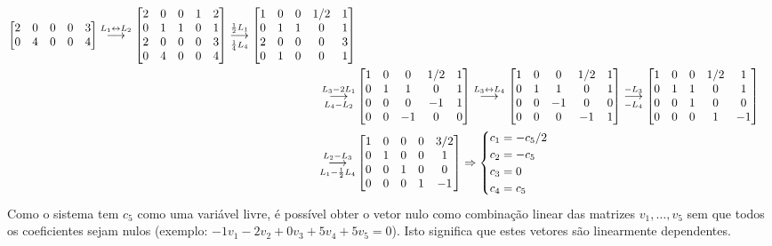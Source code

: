 \documentclass[12pt,a4paper]{article}
\newcommand{\grstep}[2][\relax]{%
   \ensuremath{\mathrel{
       {\mathop{\longrightarrow}\limits^{#2\mathstrut}_{
                                     \begin{subarray}{l} #1 \end{subarray}}}}}}
\newcommand{\swap}{\leftrightarrow}
\begin{document}
\begin{enumerate}
\begin{enumerate}
\begin{align*}
\begin{bmatrix}
2 & 0 & 0 & 0 & 3 \\
0 & 4 & 0 & 0 & 4
\end{bmatrix}
\grstep{ L_1 \swap L_2 }
\begin{bmatrix}
2 & 0 & 0 & 1 & 2 \\
0 & 1 & 1 & 0 & 1 \\
2 & 0 & 0 & 0 & 3 \\
0 & 4 & 0 & 0 & 4
\end{bmatrix}
\grstep[ \frac{1}{4}L_4 ]{ \frac{1}{2}L_1 }
\begin{bmatrix}
1 & 0 & 0 & 1/2 & 1 \\
0 & 1 & 1 & 0 & 1 \\
2 & 0 & 0 & 0 & 3 \\
0 & 1 & 0 & 0 & 1
\end{bmatrix}\\
\grstep[ L_4 - L_2 ]{ L_3 - 2L_1 }
& \begin{bmatrix}
1 & 0 & 0 & 1/2 & 1 \\
0 & 1 & 1 &  0 & 1 \\
0 & 0 & 0 & -1 & 1 \\
0 & 0 & -1 & 0 & 0
\end{bmatrix}
\grstep{ L_3 \swap L_4 }
\begin{bmatrix}
1 & 0 & 0 & 1/2 & 1 \\
0 & 1 & 1 &  0 & 1 \\
0 & 0 & -1 & 0 & 0 \\
0 & 0 & 0 & -1 & 1
\end{bmatrix}
\grstep[ -L_4 ]{ -L_3 }
\begin{bmatrix}
1 & 0 & 0 & 1/2 & 1 \\
0 & 1 & 1 &  0 & 1 \\
0 & 0 & 1 & 0 & 0 \\
0 & 0 & 0 & 1 & -1
\end{bmatrix}\\
\grstep[ L_1-\frac{1}{2}L_4 ]{ L_2-L_3 }
&\begin{bmatrix}
1 & 0 & 0 & 0 & 3/2 \\
0 & 1 & 0 & 0 & 1 \\
0 & 0 & 1 & 0 & 0 \\
0 & 0 & 0 & 1 & -1
\end{bmatrix}
\Rightarrow
\begin{cases}
c_1 =-c_5/2\\
c_2 = -c_5\\
c_3 = 0\\
c_4 = c_5
\end{cases}
\end{align*}
Como o sistema tem $c_5$ como uma variável livre, é possível obter o vetor nulo como combinação linear das matrizes $v_1,\ldots,v_5$ sem que todos os coeficientes sejam nulos (exemplo: $-1v_1 - 2v_2 + 0v_3 + 5v_4 + 5v_5 = 0$). Isto significa que estes vetores são linearmente dependentes.


\end{enumerate}
\end{enumerate}
\end{document}
